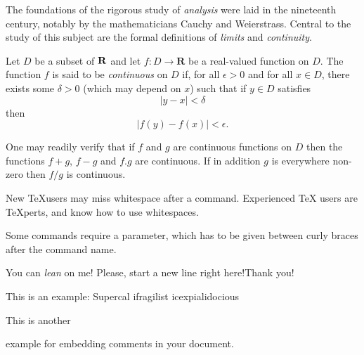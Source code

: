 \documentclass[a4paper,12pt]{article}
\begin{document}

The foundations of the rigorous study of \textit{analysis} were laid in the 
nineteenth century, notably by the mathematicians Cauchy and Weierstrass. 
Central to the study of this subject are the formal definitions of 
\textit{limits} and \textit{continuity}.

Let $D$ be a subset of $\bf R$ and let $f \colon D \to \textbf{R}$ be 
a real-valued function on $D$. The function $f$ is said to be \textit{continuous} on $D$ 
if, for all $\epsilon > 0$ and for all $x \in D$, there exists some $\delta > 0$ 
(which may depend on $x$) such that if $y \in D$ satisfies 
\[ |y - x| < \delta \] 
then 
\[ |f(y) - f(x)| < \epsilon. \]

One may readily verify that if $f$ and $g$ are continuous functions on $D$ then 
the functions $f+g$, $f-g$ and $f.g$ are continuous. 
If in addition $g$ is everywhere non-zero then $f/g$ is continuous.


New \TeX users may miss whitespace after a command. %
Experienced \TeX{} users are \TeX perts, and know how to use whitespaces. %

Some commands require a parameter, which has to be given between curly braces { } after the command name.


You can \textsl{lean} on me!
Please, start a new line right here!\newline Thank you!

This is an %
example: Supercal%
ifragilist%
icexpialidocious

This is another
\begin{comment}
rather stupid, but helpful
\end{comment}
example for embedding comments in your document.
\end{document}
